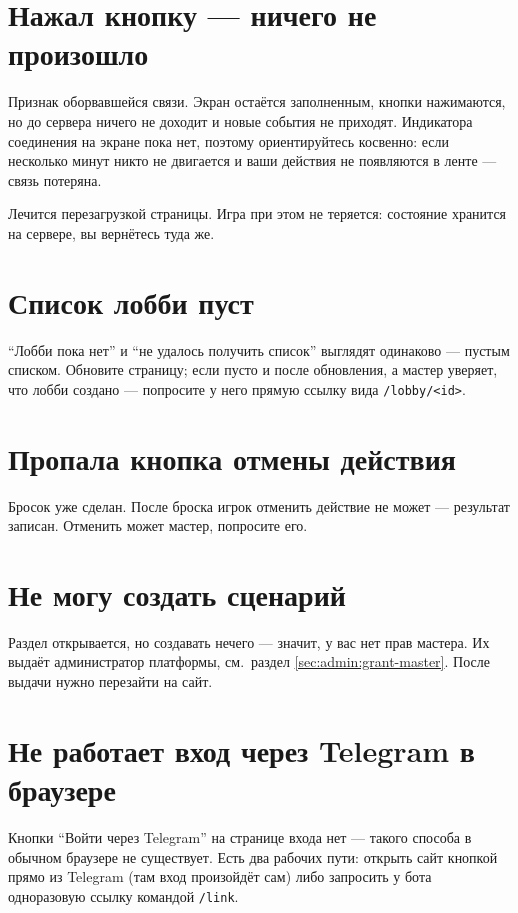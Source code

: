\section{Нажал кнопку --- ничего не произошло}
\label{sec:trouble:connection}

Признак оборвавшейся связи. Экран остаётся заполненным, кнопки нажимаются, но до сервера ничего не доходит и новые события не приходят. Индикатора соединения на экране пока нет, поэтому ориентируйтесь косвенно: если несколько минут никто не двигается и ваши действия не появляются в ленте --- связь потеряна.

Лечится перезагрузкой страницы. Игра при этом не теряется: состояние хранится на сервере, вы вернётесь туда же.

\section{Список лобби пуст}
\label{sec:trouble:empty-lobbies}

``Лобби пока нет'' и ``не удалось получить список'' выглядят одинаково --- пустым списком. Обновите страницу; если пусто и после обновления, а мастер уверяет, что лобби создано --- попросите у него прямую ссылку вида \texttt{/lobby/<id>}.

\section{Пропала кнопка отмены действия}
\label{sec:trouble:cancel-gone}

Бросок уже сделан. После броска игрок отменить действие не может --- результат записан. Отменить может мастер, попросите его.

\section{Не могу создать сценарий}
\label{sec:trouble:no-master}

Раздел открывается, но создавать нечего --- значит, у вас нет прав мастера. Их выдаёт администратор платформы, см.\ раздел \ref{sec:admin:grant-master}. После выдачи нужно перезайти на сайт.

\section{Не работает вход через Telegram в браузере}
\label{sec:trouble:tg-login}

Кнопки ``Войти через Telegram'' на странице входа нет --- такого способа в обычном браузере не существует. Есть два рабочих пути: открыть сайт кнопкой прямо из Telegram (там вход произойдёт сам) либо запросить у бота одноразовую ссылку командой \texttt{/link}.

